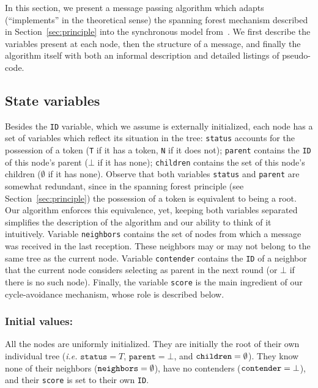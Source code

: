 \documentclass[twocolumn]{article}
\begin{document}
In this section, we present a message passing algorithm which adapts (``implements'' in the theoretical sense) the spanning forest mechanism described in Section~\ref{sec:principle} into the synchronous model from~\cite{KLO10}. We first describe the variables present at each node, then the structure of a message, and finally the algorithm itself with both an informal description and detailed listings of pseudo-code.

\subsection{State variables}
\label{sec:variables}

Besides the {\tt ID} variable, which we assume is externally initialized, each node has a set of variables which reflect its situation in the tree:
\texttt{status} accounts for the possession of a token ({\tt T} if it has a token, {\tt N} if it does not);
\texttt{parent} contains the {\tt ID} of this node's parent ($\bot$ if it has none); \texttt{children} contains the set of this node's children ($\emptyset$ if it has none).
Observe that both variables {\tt status} and {\tt parent} are somewhat redundant, since in the spanning forest principle (see Section~\ref{sec:principle}) the possession of a token is equivalent to being a root. Our algorithm enforces this equivalence, yet, keeping both variables separated simplifies the description of the algorithm and our ability to think of it intuitively.
Variable {\tt neighbors} contains the set of nodes from which a message was received in the last reception. These neighbors may or may not belong to the same tree as the current node. Variable {\tt contender} contains the {\tt ID} of a neighbor that the current node considers selecting as parent in the next round (or $\bot$ if there is no such node). Finally, the variable {\tt score} is the main ingredient of our cycle-avoidance mechanism, whose role is described below. 

\subsubsection{Initial values:} All the nodes are uniformly initialized. They are initially the root of their own individual tree ({\it i.e.} $\texttt{status}=T$, $\texttt{parent}=\bot$, and ${\tt children}=\emptyset$). They know none of their neighbors (${\tt neighbors}=\emptyset$), have no contenders (${\tt contender}=\bot$), and their {\tt score} is set to their own {\tt ID}.
\end{document}
